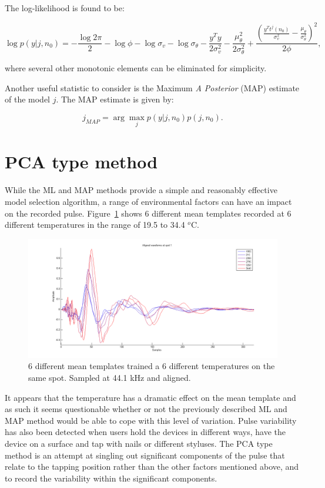 The log-likelihood is found to be:

\begin{equation}\label{eq:MLloglikelihood}
\log{p(y|j,n_0)} = -\frac{\log{2\pi}}{2} - \log{\phi} - \log{\sigma_v} -\log{\sigma_\theta} - \frac{y^T y}{2\sigma_v^2} -\frac{\mu^2_\theta}{2\sigma^2_\theta} + \frac{\left(\frac{y^T t^j(n_0)}{\sigma^2_v}-\frac{\mu_\theta}{\sigma^2_\theta}\right)^2}{2\phi},
\end{equation}

where several other monotonic elements can be eliminated for simplicity.

Another useful statistic to consider is the Maximum \emph{A Posterior} (MAP) estimate of the model $j$. The MAP estimate is given by:

\begin{equation}\label{eq:MAPdefinition}
j_{MAP} = \arg\max_j p(y|j,n_0)p(j,n_0).
\end{equation}


\section{PCA type method}\label{sec:APRpca}
While the ML and MAP methods provide a simple and reasonably effective model selection algorithm, a range of environmental factors can have an impact on the recorded pulse. Figure~\ref{fig:shiftOverTemperature} shows 6 different mean templates recorded at 6 different temperatures in the range of 19.5 to 34.4 $^o$C.

\begin{figure}[!]
\centering
\includegraphics[width=150mm]{shiftOverTemperature.png}
\caption{6 different mean templates trained a 6 different temperatures on the same spot. Sampled at 44.1 kHz and aligned.}\label{fig:shiftOverTemperature}
\end{figure}
It appears that the temperature has a dramatic effect on the mean template and as such it seems questionable whether or not the previously described ML and MAP method would be able to cope with this level of variation. Pulse variability has also been detected when users hold the devices in different ways, have the device on a surface and tap with nails or different styluses. The PCA type method is an attempt at singling out significant components of the pulse that relate to the tapping position rather than the other factors mentioned above, and to record the variability within the significant components.

